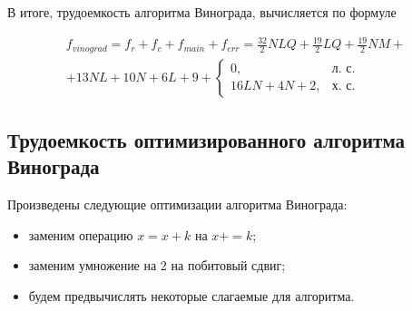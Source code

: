 \clearpage

В итоге, трудоемкость алгоритма Винограда, вычисляется по формуле

\begin{equation}
	\label{eq:vinograd}
	\begin{gathered}
		f_{vinograd} = f_{r} + f_{c} + f_{main} + f_{err} = \frac{32}{2}NLQ + \frac{19}{2}LQ + \frac{19}{2} NM + \\
		+ 13NL + 10N + 6L + 9 + 
		\begin{cases}
			0, & \text{л.~с.}\\
			16LN + 4N + 2, & \text{х.~с.}
		\end{cases}
	\end{gathered}
\end{equation}


\subsection{Трудоемкость оптимизированного алгоритма Винограда}

Произведены следующие оптимизации алгоритма Винограда:
\begin{itemize}
	\item заменим операцию $x = x + k$ на $x += k$;
	\item заменим умножение на 2 на побитовый сдвиг;
	\item будем предвычислять некоторые слагаемые для алгоритма.
\end{itemize}

